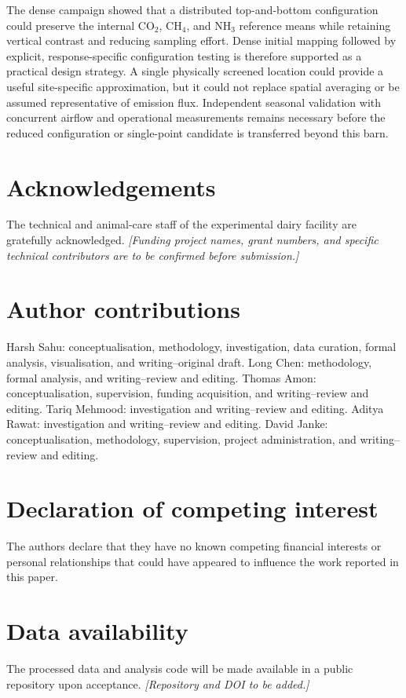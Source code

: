 \documentclass[12pt,a4paper]{article}
\begin{document}
The dense campaign showed that a distributed top-and-bottom configuration
could preserve the internal \(\mathrm{CO_2}\), \(\mathrm{CH_4}\), and
\(\mathrm{NH_3}\) reference means while retaining vertical contrast and
reducing sampling effort. Dense initial mapping followed by explicit,
response-specific configuration testing is therefore supported as a practical
design strategy. A single physically screened location could provide a useful
site-specific approximation, but it could not replace spatial averaging or be
assumed representative of emission flux. Independent seasonal validation with
concurrent airflow and operational measurements remains necessary before the
reduced configuration or single-point candidate is transferred beyond this
barn.

\section*{Acknowledgements}

The technical and animal-care staff of the experimental dairy facility are
gratefully acknowledged. \textit{[Funding project names, grant numbers, and
specific technical contributors are to be confirmed before submission.]}

\section*{Author contributions}

Harsh Sahu: conceptualisation, methodology, investigation, data curation,
formal analysis, visualisation, and writing--original draft. Long Chen:
methodology, formal analysis, and writing--review and editing. Thomas Amon:
conceptualisation, supervision, funding acquisition, and writing--review and
editing. Tariq Mehmood: investigation and writing--review and editing. Aditya
Rawat: investigation and writing--review and editing. David Janke:
conceptualisation, methodology, supervision, project administration, and
writing--review and editing.

\section*{Declaration of competing interest}

The authors declare that they have no known competing financial interests or
personal relationships that could have appeared to influence the work
reported in this paper.

\section*{Data availability}

The processed data and analysis code will be made available in a public
repository upon acceptance. \textit{[Repository and DOI to be added.]}



\end{document}
